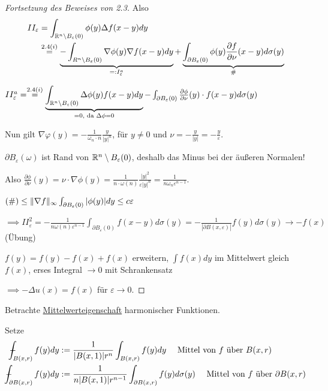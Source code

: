 \begin{proof}[Fortsetzung des Beweises von 2.3]
  Also 
  \begin{align*}
    II_\varepsilon 
    &= \int_{\mathbb{R}^n \setminus B_\varepsilon(0)} \phi(y) \Delta f(x - y) dy\\
    &\overset{2.4(i)}{=} \underbrace{-\int_{R^n \setminus B_\varepsilon(0)} \nabla \phi(y) \nabla f(x - y) dy}_{=: I_\varepsilon^a}  +  \underbrace{\int_{\partial B_\varepsilon(0)} \phi(y) \frac{\partial f}{\partial \nu}(x - y) d\sigma(y)}_{\#}
  \end{align*}

  $II_\varepsilon^a = \overset{2.4(i)}{=} \underbrace{\int_{\mathbb{R}^n \setminus B_\varepsilon(0)} \Delta \phi(y) f(x - y) dy}_{= 0, \text{ da } \Delta \phi = 0} - \int_{\partial B_\varepsilon(0)} \frac{\partial \phi}{\partial \nu}(y) \cdot f(x - y) d\sigma(y)$

  Nun gilt $\nabla \varphi(y) = - \frac{1}{\omega_n \cdot n} \frac{y}{|y|^n}$, für $y \neq 0$ und $\nu = -\frac{y}{|y|} = - \frac{y}{\varepsilon}$.

  {\tiny{$\partial B_\varepsilon(\omega)$ ist Rand von $\mathbb{R}^n \setminus B_\varepsilon(0)$, deshalb das Minus bei der äußeren Normalen! }}

  Also $\frac{\partial \phi}{\partial \nu}(y) = \nu \cdot \nabla \phi(y) = \frac{1}{n \cdot \omega(n)} \frac{|y|^2}{\varepsilon |y|^n} = \frac{1}{n \omega_n \varepsilon^{n - 1}}$.

  {\tiny{$(\#) \leq \lVert \nabla f \rVert_\infty \int_{\partial B_\varepsilon(0)} |\phi(y) | dy \leq c \varepsilon$}}

  $\implies II_\varepsilon^2 = - \frac{1}{n \omega(n) \varepsilon^{n - 1}} \int_{\partial B_\varepsilon(0)} f(x - y) d \sigma(y) = -\frac{1}{|\partial B(x, \varepsilon)|} f(y) d\sigma(y) \to -f(x)$ (Übung)

  {\tiny{$f(y) = f(y) - f(x) + f(x)$ erweitern, $\int f(x) dy$ im Mittelwert gleich $f(x)$, erses Integral $\to 0$ mit Schrankensatz}}

  $\implies -\Delta u(x) = f(x)$ für $\varepsilon \to 0$.
\end{proof}

Betrachte \underline{Mittelwerteigenschaft} harmonischer Funktionen.

Setze 
\begin{align*} 
  \dashint_{B(x,r)} f(y) dy &:= \frac{1}{|B(x,1)| r^n} \int_{B(x,r)} f(y) dy \quad\text{ Mittel von $f$ über $B(x,r)$} \\
  \dashint_{\partial B(x,r)} f(y) dy &:= \frac{1}{n |B(x,1)|r^{n-1}} \int_{\partial B(x,r)} f(y) d\sigma(y) \quad\text{ Mittel von $f$ über $\partial B(x,r)$}
\end{align*}

